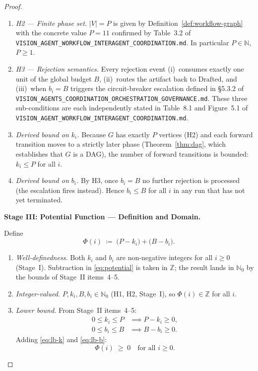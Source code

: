 \documentclass[12pt]{article}
\theoremstyle{definition}
\newcommand{\code}[1]{\texttt{#1}}
\newcommand{\VisionGov}{\code{VISION\_AGENTS\_\allowbreak COORDINATION\_\allowbreak ORCHESTRATION\_\allowbreak GOVERNANCE.md}}
\newcommand{\VisionFlow}{\code{VISION\_AGENT\_\allowbreak WORKFLOW\_\allowbreak INTERAGENT\_\allowbreak COORDINATION.md}}
\begin{document}
\begin{proof}
\begin{enumerate}
  \item \emph{H2 — Finite phase set.}  $|V| = P$ is given by
        Definition~\ref{def:workflow-graph} with the concrete value
        $P = 11$ confirmed by Table~3.2 of
        \VisionFlow{}.
        In particular $P \in \mathbb{N}$, $P \geq 1$.

  \item \emph{H3 — Rejection semantics.}  Every rejection event
        (i)~consumes exactly one unit of the global budget $B$,
        (ii)~routes the artifact back to $\mathrm{Drafted}$, and
        (iii)~when $b_i = B$ triggers the circuit-breaker escalation
        defined in \S5.3.2 of
        \VisionGov{}.  These three sub-conditions are each
        independently stated in Table~8.1 and Figure~5.1 of
        \VisionFlow{}.

  \item \emph{Derived bound on $k_i$.}  Because $G$ has exactly $P$
        vertices (H2) and each forward transition moves to a
        strictly later phase (Theorem~\ref{thm:dag}, which establishes
        that $G$ is a DAG), the number of forward transitions is
        bounded: $k_i \leq P$ for all $i$.

  \item \emph{Derived bound on $b_i$.}  By H3, once $b_i = B$ no
        further rejection is processed (the escalation fires
        instead).  Hence $b_i \leq B$ for all $i$ in any run that
        has not yet terminated.
\end{enumerate}

\medskip
\noindent\textbf{Stage III: Potential Function — Definition and Domain.}

Define
\begin{equation}
\label{eq:potential}
\Phi(i) \;\coloneqq\; \bigl(P - k_i\bigr) + \bigl(B - b_i\bigr).
\end{equation}

\begin{enumerate}
  \item \emph{Well-definedness.}  Both $k_i$ and $b_i$ are
        non-negative integers for all $i \geq 0$ (Stage~I).
        Subtraction in \eqref{eq:potential} is taken in $\mathbb{Z}$;
        the result lands in $\mathbb{N}_0$ by the bounds of Stage~II
        items~4--5.

  \item \emph{Integer-valued.}  $P, k_i, B, b_i \in \mathbb{N}_0$
        (H1, H2, Stage~I), so $\Phi(i) \in \mathbb{Z}$ for all $i$.

  \item \emph{Lower bound.}  From Stage~II items~4--5:
        \begin{align}
          0 \leq k_i \leq P &\implies P - k_i \geq 0, \label{eq:lb-k}\\
          0 \leq b_i \leq B &\implies B - b_i \geq 0. \label{eq:lb-b}
        \end{align}
        Adding \eqref{eq:lb-k} and \eqref{eq:lb-b}:
        \begin{equation}
          \label{eq:phi-lb}
          \Phi(i) \;\geq\; 0 \quad \text{for all } i \geq 0.
        \end{equation}


\end{enumerate}
\end{proof}
\end{document}
